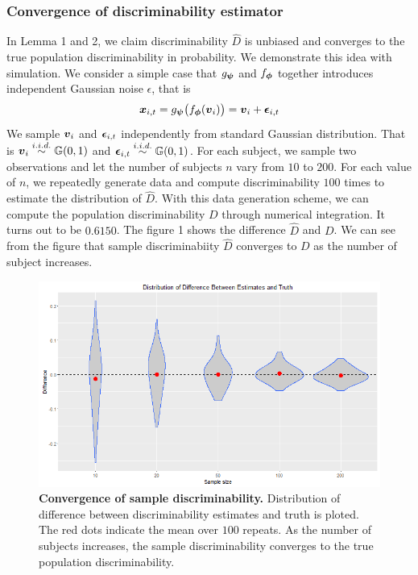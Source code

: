 \documentclass{article}
\begin{document}
\subsubsection{Convergence of discriminability estimator}
In Lemma 1 and 2, we claim discriminability $\hat{D}$ is unbiased and converges to  the true population discriminability in probability. We demonstrate this idea with simulation. We consider a simple case that $g_{\boldsymbol{\psi}}$ and $f_{\boldsymbol{\phi}}$ together introduces independent Gaussian noise $\epsilon$, that is
\begin{equation}
\boldsymbol{x}_{i,t} =g_{\boldsymbol{\psi}} \big(f_{\boldsymbol{\phi}} (\boldsymbol{v}_i) \big) =\boldsymbol{v}_{i} + \boldsymbol{\epsilon}_{i,t}
\end{equation}  
We sample $\boldsymbol{v}_{i}$ and $\boldsymbol{\epsilon}_{i,t}$ independently from standard Gaussian distribution. That is $\boldsymbol{v}_i \overset{i.i.d.}{\sim} \mathbb{G}(0,1)$ and $\boldsymbol{\epsilon}_{i,t} \overset{i.i.d.}{\sim} \mathbb{G}(0,1)$. For each  subject, we sample two observations and let the number of subjects $n$ vary from $10$ to $200$. For each value of $n$, we repeatedly generate data and compute discriminability $100$ times to estimate the distribution of $\hat{D}$. With this data generation scheme, we can compute the population discriminability $D$ through numerical integration. It turns out to be $0.6150$. The figure 1 shows the difference $\hat{D}$ and $D$. We can see from the figure that sample discriminabiity $\hat{D}$ converges to $D$ as the number of subject increases.
\begin{figure}[ht!]
	\includegraphics[width=\linewidth]{../Figs/rel_conv.png}
	\caption{{\bf Convergence of sample discriminability.} Distribution of difference between discriminability estimates and truth is ploted. The red dots indicate the mean over $100$ repeats. As the number of subjects increases, the sample discriminability converges to the true population discriminability. }
	\label{fig:1}
\end{figure}
\end{document}
